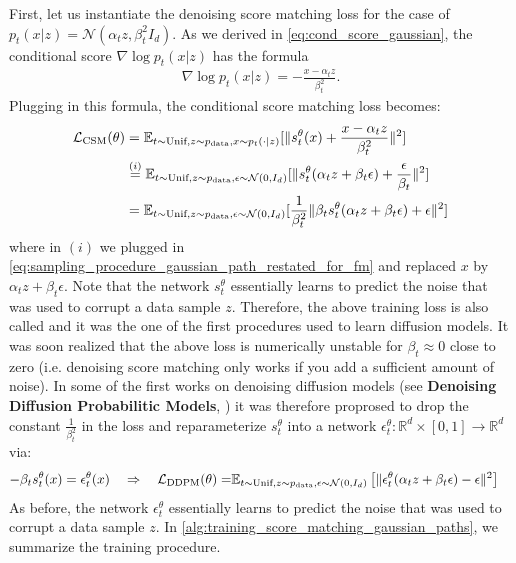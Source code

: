 \begin{examplebox}
First, let us instantiate the denoising score matching loss for the case of $p_t(x|z)=\mathcal{N}(\alpha_tz,\beta_t^2I_d)$. As we derived in \cref{eq:cond_score_gaussian}, the conditional score $\nabla\log p_t(x|z)$ has the formula
\begin{align}
\label{e:marginal_vf_cond_score_restated}
    \nabla\log p_t(x|z) = -\frac{x-\alpha_t z}{\beta_t^2}.
\end{align}
Plugging in this formula, the conditional score matching loss becomes:
\begin{align*}
        \mathcal{L}_{\text{CSM}}(\theta) &=\mathbb{E}_{t\sim\text{Unif},z\sim p_{\rm{data}}, x\sim p_t(\cdot|z)}[\|s_t^\theta(x)+\frac{x-\alpha_t z}{\beta_t^2}\|^2]\\&\overset{(i)}{=}\mathbb{E}_{t\sim\text{Unif},z\sim p_{\rm{data}}, \epsilon\sim \mathcal{N}(0,I_d)}[\|s_t^\theta(\alpha_tz+\beta_t\epsilon)+\frac{\epsilon}{\beta_t}\|^2]\\
        &=\mathbb{E}_{t\sim\text{Unif},z\sim p_{\rm{data}}, \epsilon\sim \mathcal{N}(0,I_d)}[\frac{1}{\beta_t^2}\|\beta_ts_t^\theta(\alpha_tz+\beta_t\epsilon)+\epsilon\|^2]
\end{align*}
where in $(i)$ we plugged in \cref{eq:sampling_procedure_gaussian_path_restated_for_fm} and replaced $x$ by $\alpha_tz+\beta_t\epsilon$. Note that the network $s_t^\theta$ essentially learns to predict the noise that was used to corrupt a data sample $z$. Therefore, the above training loss is also called  and it was the one of the first procedures used to learn diffusion models. It was soon realized that the above loss is numerically unstable for $\beta_t\approx 0$ close to zero (i.e. denoising score matching only works if you add a sufficient amount of noise). In some of the first works on denoising diffusion models (see \textbf{Denoising Diffusion Probabilitic Models}, \citep{ho2020denoising}) it was therefore proprosed to drop the constant $\frac{1}{\beta_t^2}$ in the loss and reparameterize $s_t^\theta$ into a  network $\epsilon_t^\theta:\mathbb{R}^d\times[0,1]\to\mathbb{R}^d$ via:
\begin{align*}
    -\beta_t s_t^\theta(x) = \epsilon_t^\theta(x)\quad \Rightarrow \quad \mathcal{L}_{\text{DDPM}}(\theta) =&\mathbb{E}_{t\sim\text{Unif},z\sim p_{\rm{data}}, \epsilon\sim \mathcal{N}(0,I_d)}\left[\|\epsilon_t^\theta(\alpha_tz+\beta_t\epsilon)-\epsilon\|^2\right]
\end{align*}
As before, the network $\epsilon_t^\theta$ essentially learns to predict the noise that was used to corrupt a data sample $z$. In \cref{alg:training_score_matching_gaussian_paths}, we summarize the training procedure.


\end{examplebox}
